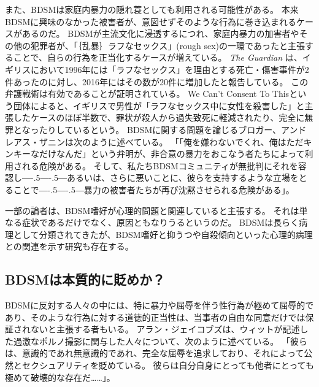 \documentclass[paper=a4,book,openany]{jlreq}
\def\DDASH{―\kern-.5\zw―\kern-.5\zw―} %
\begin{document}
また、BDSMは家庭内暴力の隠れ蓑としても利用される可能性がある。
本来BDSMに興味のなかった被害者が、意図せずそのような行為に巻き込まれるケースがあるのだ。
BDSMが主流文化に浸透するにつれ、家庭内暴力の加害者やその他の犯罪者が、「｛乱暴｝{ラフ}なセックス」(rough sex)の一環であったと主張することで、自らの行為を正当化するケースが増えている。
\emph{The Guardian} は、イギリスにおいて1996年には「ラフなセックス」を理由とする死亡・傷害事件が2件あったのに対し、2016年にはその数が20件に増加したと報告している\citep{grierson20:_gover_consid_law_curb_use}。
この弁護戦術は有効であることが証明されている。
We Can't Consent To Thisという団体によると、イギリスで男性が「ラフなセックス中に女性を殺害した」と主張したケースのほぼ半数で、罪状が殺人から過失致死に軽減されたり、完全に無罪となったりしているという\citep{harman20:_rough_sex_gone_wrong_defen,woodyatt20:_grace_millan_rise_shades_defen_murder_trial}。
BDSMに関する問題を論じるブロガー、アンドレアス・ザニンは次のように述べている。
「「俺を嫌わないでくれ、俺はただキンキーなだけなんだ」という弁明が、非合意の暴力をおこなう者たちによって利用される危険がある。
そして、私たちBDSMコミュニティが無批判にそれを容認し{\DDASH}あるいは、さらに悪いことに、彼らを支持するような立場をとることで{\DDASH}暴力の被害者たちが再び沈黙させられる危険がある」\citep{zanin14:_poor_persec_perver}。

一部の論者は、BDSM嗜好が心理的問題と関連していると主張する。
それは単なる症状であるだけでなく、原因ともなりうるというのだ。
BDSMは長らく病理として分類されてきたが、BDSM嗜好と抑うつや自殺傾向といった心理的病理との関連を示す研究も存在する\citep{brown17:_suicid_risk_bdsm_pract}。

\subsection{BDSMは本質的に貶めか？}

BDSMに反対する人々の中には、特に暴力や屈辱を伴う性行為が極めて屈辱的であり、そのような行為に対する道徳的正当性は、当事者の自由な同意だけでは保証されないと主張する者もいる。
アラン・ジェイコブズは、ウィットが記述した過激なポルノ撮影に関与した人々について、次のように述べている。
「彼らは、意識的であれ無意識的であれ、完全な屈辱を追求しており、それによって公然とセクシュアリティを貶めている。
彼らは自分自身にとっても他者にとっても極めて破壊的な存在だ……」\citep{jacobs03:_in_which_noah_millm_i}。
\end{document}
